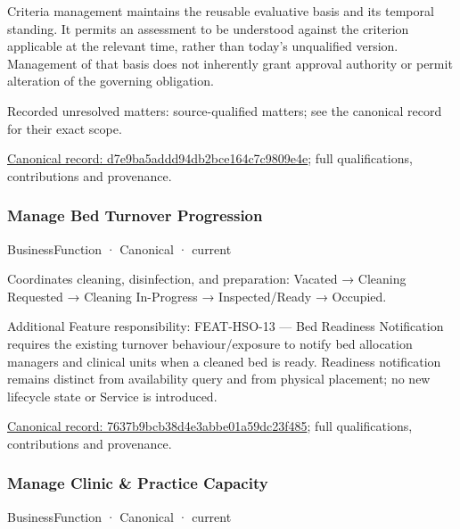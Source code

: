 Criteria management maintains the reusable evaluative basis and its temporal standing. It permits an assessment to be understood against the criterion applicable at the relevant time, rather than today's unqualified version. Management of that basis does not inherently grant approval authority or permit alteration of the governing obligation.


{\small Recorded unresolved matters: source-qualified matters; see the canonical record for their exact scope.}\par
{\footnotesize \href{../../../../continuum/business/business-function/d7e9ba5addd94db2bce164c7c9809e4e.md}{Canonical record: d7e9ba5addd94db2bce164c7c9809e4e}; full qualifications, contributions and provenance.}\par
\subsubsection{Manage Bed Turnover Progression}

\label{element:7637b9bcb38d4e3abbe01a59dc23f485}
{\small BusinessFunction · Canonical · current}\par

Coordinates cleaning, disinfection, and preparation: Vacated → Cleaning Requested → Cleaning In-Progress → Inspected/Ready → Occupied.



Additional Feature responsibility: FEAT-HSO-13 — Bed Readiness Notification requires the existing turnover behaviour/exposure to notify bed allocation managers and clinical units when a cleaned bed is ready. Readiness notification remains distinct from availability query and from physical placement; no new lifecycle state or Service is introduced.


{\footnotesize \href{../../../../continuum/business/business-function/7637b9bcb38d4e3abbe01a59dc23f485.md}{Canonical record: 7637b9bcb38d4e3abbe01a59dc23f485}; full qualifications, contributions and provenance.}\par
\subsubsection{Manage Clinic \& Practice Capacity}

\label{element:389fb97b2bcd4527959a61f2a288bc39}
{\small BusinessFunction · Canonical · current}\par


